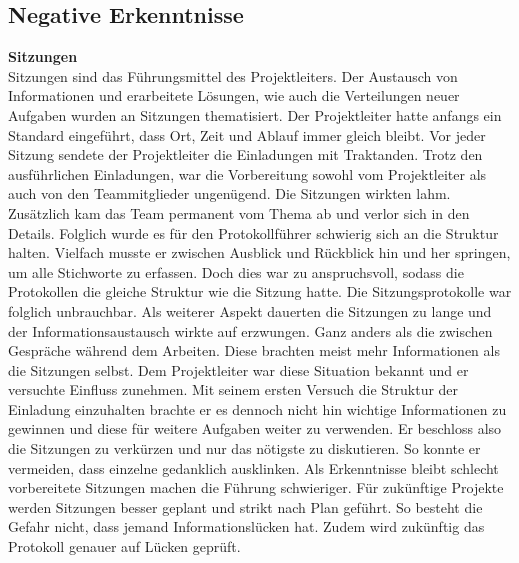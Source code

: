 \subsection{Negative Erkenntnisse}
\textbf{Sitzungen}\\
Sitzungen sind das Führungsmittel des Projektleiters. Der Austausch von Informationen und erarbeitete Lösungen, wie auch die Verteilungen neuer Aufgaben wurden an Sitzungen thematisiert. Der Projektleiter hatte anfangs ein Standard eingeführt, dass Ort, Zeit und Ablauf immer gleich bleibt. Vor jeder Sitzung sendete der Projektleiter die Einladungen mit Traktanden. Trotz den ausführlichen Einladungen, war die Vorbereitung sowohl vom Projektleiter als auch von den Teammitglieder ungenügend. Die Sitzungen wirkten lahm. Zusätzlich kam das Team permanent vom Thema ab und verlor sich in den Details. Folglich wurde es für den Protokollführer schwierig sich an die Struktur halten. Vielfach musste er zwischen Ausblick und Rückblick hin und her springen, um alle Stichworte zu erfassen. Doch dies war zu anspruchsvoll, sodass die Protokollen die gleiche Struktur wie die Sitzung hatte. Die Sitzungsprotokolle war folglich unbrauchbar. Als weiterer Aspekt dauerten die Sitzungen  zu lange und der Informationsaustausch wirkte auf erzwungen. Ganz anders als die zwischen Gespräche während dem Arbeiten. Diese brachten meist mehr Informationen als die Sitzungen selbst. Dem Projektleiter war diese Situation bekannt und er versuchte Einfluss zunehmen. Mit seinem ersten Versuch die Struktur der Einladung einzuhalten brachte er es dennoch nicht hin wichtige Informationen zu gewinnen und diese für weitere Aufgaben weiter zu verwenden. Er beschloss also die Sitzungen zu verkürzen und nur das nötigste zu diskutieren. So konnte er vermeiden, dass einzelne gedanklich ausklinken. 
Als Erkenntnisse bleibt schlecht vorbereitete Sitzungen machen die Führung schwieriger. Für zukünftige Projekte werden Sitzungen besser geplant und strikt nach Plan geführt. So besteht die Gefahr nicht, dass jemand Informationslücken hat. Zudem wird zukünftig das Protokoll genauer auf Lücken geprüft.\\

